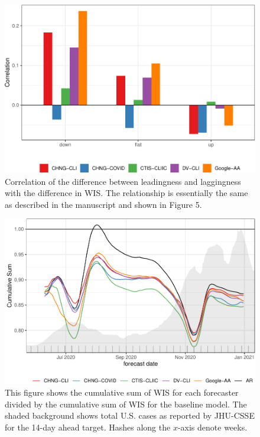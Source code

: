 \documentclass[9pt,twoside,lineno]{pnas-new}
\begin{document}
\clearpage

\begin{figure}

{\centering \includegraphics[width=\textwidth]{fig/diff-in-lead-lag-1} 

}

\caption{Correlation of the difference between leadingness and laggingness with the difference in WIS. The relationship is essentially the same as described in the manuscript and shown in Figure 5.}\label{fig:diff-in-lead-lag}
\end{figure}

\clearpage

\clearpage

\begin{figure}

{\centering \includegraphics[width=\textwidth]{fig/cumulative-mean-1} 

}

\caption{This figure shows the cumulative sum of WIS for each forecaster divided by the cumulative sum of WIS for the baseline model. The shaded background shows total U.S. cases as reported by JHU-CSSE for the 14-day ahead target. Hashes along the $x$-axis denote weeks.}\label{fig:cumulative-mean}
\end{figure}
\end{document}
